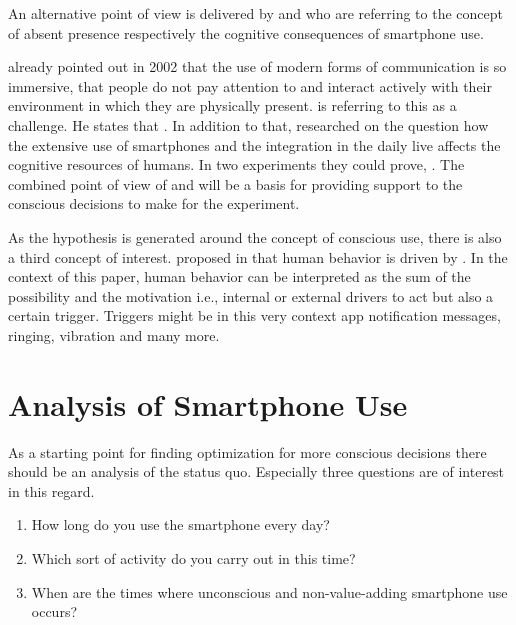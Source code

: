 \documentclass[11pt,a4paper]{article}
\begin{document}
An alternative point of view is delivered by \cite{Gergen.2002} and \cite{Ward.2017} who are referring to the concept of absent presence respectively the cognitive consequences of smartphone use.
\begin{center}
 \autocite[][p.227]{Gergen.2002}
\end{center}
\cite{Gergen.2002} already pointed out in 2002 that the use of modern forms of communication is so immersive, that people do not pay attention to and interact actively with their environment in which they are physically present. \cite{Gergen.2002} is referring to this as a challenge. He states that  \autocite[][p.236]{Gergen.2002}. In addition to that, \cite{Ward.2017} researched on the question how the extensive use of smartphones and the integration in the daily live affects the cognitive resources of humans. In two experiments they could prove,  \autocite[][]{Ward.2017}. The combined point of view of \cite{Gergen.2002} and \cite{Ward.2017} will be a basis for providing support to the conscious decisions to make for the experiment.

As the hypothesis is generated around the concept of conscious use, there is also a third concept of interest. \cite{Fogg.2015} proposed in  that human behavior is driven by . In the context of this paper, human behavior can be interpreted as the sum of the possibility and the motivation i.e., internal or external drivers to act but also a certain trigger. Triggers might be in this very context app notification messages, ringing, vibration and many more. 


\section*{Analysis of Smartphone Use}
As a starting point for finding optimization for more conscious decisions there should be an analysis of the status quo. Especially three questions are of interest in this regard. 
\begin{enumerate}
\item How long do you use the smartphone every day?
\item Which sort of activity do you carry out in this time?
\item When are the times where unconscious and non-value-adding smartphone use occurs?
\end{enumerate}
\end{document}
